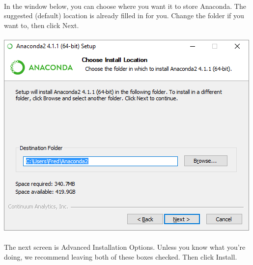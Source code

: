 \documentclass[]{article}
\begin{document}
\paragraph{}
In the window below, you can choose where you want it to store Anaconda. The suggested (default) location is already filled in for you. Change the folder if you want to, then click Next.
\paragraph{}
\begin{centering}
    \centerline{\includegraphics[scale=0.7]{Screenshot_8.png}}
\end{centering}
\paragraph{}

\paragraph{}
The next screen is Advanced Installation Options. Unless you know what you're doing, we recommend leaving both of these boxes checked. Then click Install.
\end{document}
